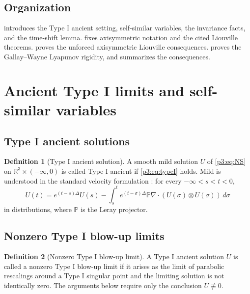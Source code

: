 \documentclass[11pt]{amsart}
\theoremstyle{plain}
\theoremstyle{definition}
\newtheorem{definition}[definition]{Definition}
\theoremstyle{remark}
\numberwithin{equation}{section}
\begin{document}
\subsection{Organization}

 introduces the Type I ancient setting, self-similar variables, the
invariance facts, and the time-shift lemma.
 fixes axisymmetric notation and the
cited Liouville theorems.   proves the
unforced axisymmetric Liouville consequences.
 proves the Gallay--Wayne Lyapunov rigidity, and
 summarizes the consequences.

\section{Ancient Type I limits and self-similar variables}
\label{p3:sec:typeI}

\subsection{Type I ancient solutions}

\begin{definition}[Type I ancient solution]
\label{p3:def:typeI-ancient}
A smooth mild solution \(U\) of \eqref{p3:eq:NS} on
\(\mathbb R^3\times(-\infty,0)\) is called Type I ancient if
\eqref{p3:eq:typeI} holds.  Mild is understood in the standard velocity
formulation \cite{Kato1984,Sohr2001}: for every \(-\infty<s<t<0\),
\begin{equation}\label{p3:eq:mild-formula}
   U(t)=e^{(t-s)\Delta}U(s)
   -\int_s^t e^{(t-\sigma)\Delta}\mathbb P\nabla\cdot
      (U(\sigma)\otimes U(\sigma))\,d\sigma
\end{equation}
in distributions, where \(\mathbb P\) is the Leray projector.
\end{definition}

\subsection{Nonzero Type I blow-up limits}

\begin{definition}[Nonzero Type I blow-up limit]
\label{p3:def:nonzero-typeI-limit}
A Type I ancient solution \(U\) is called a nonzero Type I blow-up limit if it
arises as the limit of parabolic rescalings around a Type I singular point and
the limiting solution is not identically zero.  The arguments below require
only the conclusion \(U\not\equiv0\).
\end{definition}
\end{document}
